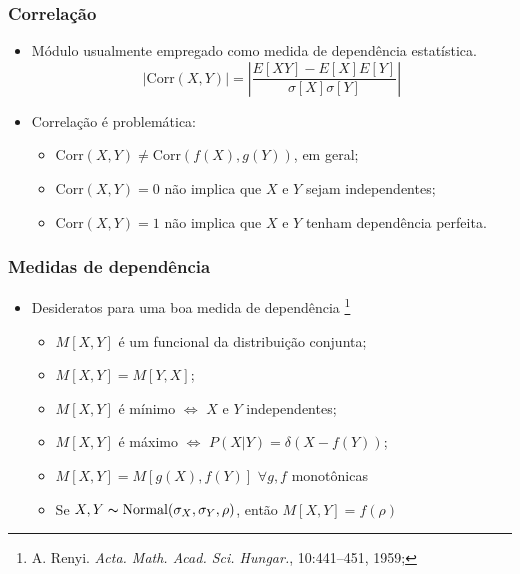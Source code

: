 \documentclass[ignorenonframetext,]{beamer}
\begin{document}
\begin{frame}\frametitle{Correlação}

\begin{itemize}
\itemsep1pt\parskip0pt
\item
  Módulo usualmente empregado como medida de dependência estatística.
  \[\vert \mathrm{Corr}(X,Y)\vert  = \left\vert  \frac{E[XY] - E[X]E[Y]}{\sigma[X]\sigma[Y]}\right\vert \]
\item
  Correlação é problemática:

  \begin{itemize}
  \itemsep1pt\parskip0pt
  \item
    $\mathrm{Corr}(X,Y) \ne \mathrm{Corr}(f(X), g(Y)) $, em geral;
  \item
    $\mathrm{Corr}(X,Y) = 0$ não implica que $X$ e $Y$ sejam
    independentes;
  \item
    $\mathrm{Corr}(X,Y) = 1$ não implica que $X$ e $Y$ tenham
    dependência perfeita.
  \end{itemize}
\end{itemize}

\end{frame}

\begin{frame}\frametitle{Medidas de dependência}

\begin{itemize}
\itemsep1pt\parskip0pt
\item
  Desideratos para uma boa medida de dependência
  \footnote{A. Renyi. \textit{Acta. Math. Acad. Sci. Hungar.}, 10:441–451, 1959;}

  \begin{itemize}
  \itemsep1pt\parskip0pt
  \item
    $M[X,Y]$ é um funcional da distribuição conjunta;
  \item
    $M[X,Y] = M[Y,X]$;
  \item
    $M[X,Y]$ é mínimo $\Leftrightarrow$ $X$ e $Y$ independentes;
  \item
    $M[X,Y]$ é máximo $\Leftrightarrow$
    $P(X\vert Y) = \delta(X - f(Y))$;
  \item
    $M[X,Y] = M[g(X), f(Y)]$ $\forall g, f$ monotônicas
  \item
    Se $X,Y \thicksim \mathrm{Normal}(\sigma_X, \sigma_Y, \rho)$, então
    $M[X,Y] = f(\rho)$
  \end{itemize}
\end{itemize}

\end{frame}
\end{document}
